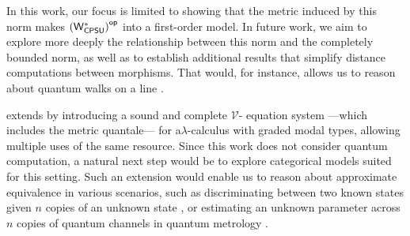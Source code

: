 In this work, our focus is limited to showing that the metric induced by this norm makes $\left(\mathsf{W^*_{CPSU}}\right)^{\mathsf{op}}$ into a first-order model. In future work, we aim to explore more deeply the relationship between this norm and the completely bounded norm, as well as to establish additional results that simplify distance computations between morphisms. That would, for instance, allows us to reason about quantum walks on a line \cite{venegasQuantumWalksComprehensive2012}.




  \cite{dahlqvistCompleteVEquationalSystem2023} extends  \cite{dahlqvist2023syntactic} by introducing a sound and complete $\mathcal{V}$- equation system ---which includes the metric quantale--- for a$\lambda$-calculus with graded modal types, allowing multiple uses of the same resource. Since this work does not consider quantum computation, a natural next step would be to explore categorical models suited for this setting. Such an extension would enable us to reason about approximate equivalence in various scenarios, such as discriminating between two known states given $n$ copies of an unknown state \cite{Multiple_copy_two_state_discrimination}, or estimating an unknown parameter across $n$ copies of quantum channels in quantum metrology \cite{Giovannetti_Quantum_Metrology, Zhou_Limits_Noisy_Quantum_Metrology}.









